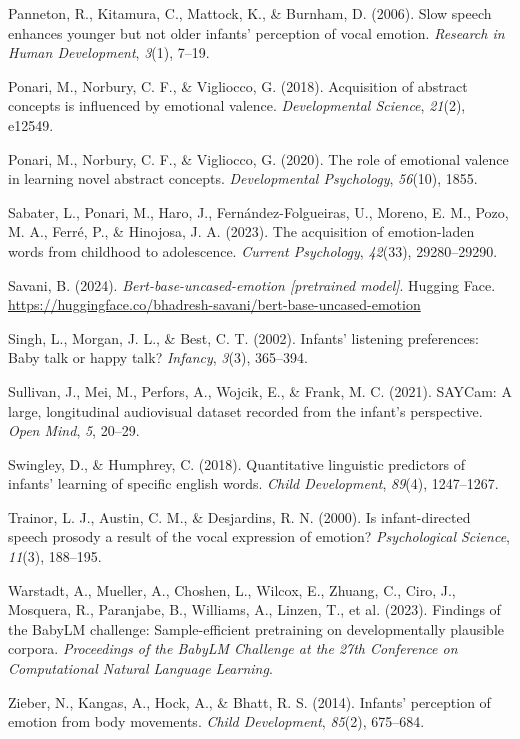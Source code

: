 \documentclass[10pt, letterpaper]{article}
\begin{document}
\begin{CSLReferences}{1}{0}
Panneton, R., Kitamura, C., Mattock, K., \& Burnham, D. (2006). Slow
speech enhances younger but not older infants' perception of vocal
emotion. \emph{Research in Human Development}, \emph{3}(1), 7--19.

Ponari, M., Norbury, C. F., \& Vigliocco, G. (2018). Acquisition of
abstract concepts is influenced by emotional valence.
\emph{Developmental Science}, \emph{21}(2), e12549.

Ponari, M., Norbury, C. F., \& Vigliocco, G. (2020). The role of
emotional valence in learning novel abstract concepts.
\emph{Developmental Psychology}, \emph{56}(10), 1855.

Sabater, L., Ponari, M., Haro, J., Fernández-Folgueiras, U., Moreno, E.
M., Pozo, M. A., Ferré, P., \& Hinojosa, J. A. (2023). The acquisition
of emotion-laden words from childhood to adolescence. \emph{Current
Psychology}, \emph{42}(33), 29280--29290.

Savani, B. (2024). \emph{Bert-base-uncased-emotion {[}pretrained
model{]}}. Hugging Face.
\url{https://huggingface.co/bhadresh-savani/bert-base-uncased-emotion}

Singh, L., Morgan, J. L., \& Best, C. T. (2002). Infants' listening
preferences: Baby talk or happy talk? \emph{Infancy}, \emph{3}(3),
365--394.

Sullivan, J., Mei, M., Perfors, A., Wojcik, E., \& Frank, M. C. (2021).
SAYCam: A large, longitudinal audiovisual dataset recorded from the
infant's perspective. \emph{Open Mind}, \emph{5}, 20--29.

Swingley, D., \& Humphrey, C. (2018). Quantitative linguistic predictors
of infants' learning of specific english words. \emph{Child
Development}, \emph{89}(4), 1247--1267.

Trainor, L. J., Austin, C. M., \& Desjardins, R. N. (2000). Is
infant-directed speech prosody a result of the vocal expression of
emotion? \emph{Psychological Science}, \emph{11}(3), 188--195.

Warstadt, A., Mueller, A., Choshen, L., Wilcox, E., Zhuang, C., Ciro,
J., Mosquera, R., Paranjabe, B., Williams, A., Linzen, T., et al.
(2023). Findings of the BabyLM challenge: Sample-efficient pretraining
on developmentally plausible corpora. \emph{Proceedings of the BabyLM
Challenge at the 27th Conference on Computational Natural Language
Learning}.

Zieber, N., Kangas, A., Hock, A., \& Bhatt, R. S. (2014). Infants'
perception of emotion from body movements. \emph{Child Development},
\emph{85}(2), 675--684.

\end{CSLReferences}


\end{document}
